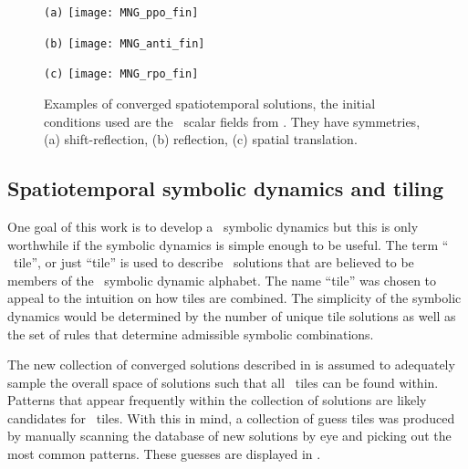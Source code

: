 \begin{figure} %
\centering
\begin{minipage}[height=.25\textheight]{.25\textwidth}
\centering \small{\texttt{(a)}}
\texttt{[image: MNG\_ppo\_fin]}
\end{minipage}
\begin{minipage}[height=.25\textheight]{.25\textwidth}
\centering \small{\texttt{(b)}}
\texttt{[image: MNG\_anti\_fin]}
\end{minipage}
\begin{minipage}[height=.25\textheight]{.25\textwidth}
\centering \small{\texttt{(c)}}
\texttt{[image: MNG\_rpo\_fin]}
\end{minipage}
\caption{ \label{fig:MNGspacetimefinal}
Examples of converged spatiotemporal solutions, the initial
conditions used are the \spt\ scalar fields from . They have
symmetries,
(a) shift-reflection,
(b) reflection,
(c) spatial translation.
}
\end{figure}


\subsection{Spatiotemporal symbolic dynamics and tiling}
\label{subsection:tiles}
One goal of this work is to develop a \spt\ symbolic dynamics but this is only worthwhile if
the symbolic dynamics is simple enough to be useful.
The term `` \spt\ tile'', or just ``tile'' is used to describe \spt\ solutions that are
believed to be members of the \spt\ symbolic dynamic alphabet. The name ``tile'' was chosen to appeal
to the intuition on how tiles are combined. The simplicity of the symbolic
dynamics would be determined by the number of unique tile solutions as well as the
set of rules that determine admissible symbolic combinations.

The new collection of converged solutions described in 
is assumed to adequately sample the overall space of solutions such that all
\spt\ tiles can be found within. Patterns
that appear frequently within the collection of solutions are likely candidates for \spt\ tiles.
With this in mind, a collection of guess tiles was produced by manually scanning the database of new
solutions by eye and picking out the most common patterns.
These guesses are displayed in .

